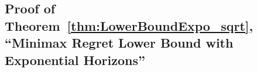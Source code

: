 \documentclass[12pt]{colt2018} %
\begin{document}



\subsection{Proof of Theorem~\ref{thm:LowerBoundExpo_sqrt}, ``Minimax Regret Lower Bound with Exponential Horizons''}\label{sub:proof_LowerBoundExpo_sqrt}
\end{document}
